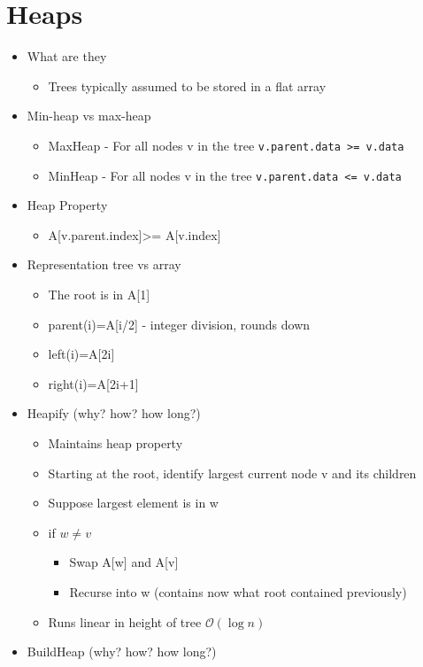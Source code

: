 \documentclass{article}[18pt]
\begin{document}
\section{Heaps}
\begin{itemize}
	\item What are they
	\begin{itemize}
		\item Trees typically assumed to be stored in a flat array
	\end{itemize}
	\item Min-heap vs max-heap
	\begin{itemize}
		\item MaxHeap - For all nodes v in the tree \texttt{v.parent.data >= v.data}
		\item MinHeap - For all nodes v in the tree \texttt{v.parent.data <= v.data}
	\end{itemize}
	\item Heap Property
	\begin{itemize}
		\item A[v.parent.index]>= A[v.index]
	\end{itemize}
	\item Representation tree vs array
	\begin{itemize}
		\item The root is in A[1]
		\item parent(i)=A[i/2] - integer division, rounds down
		\item left(i)=A[2i]
		\item right(i)=A[2i+1]
	\end{itemize}
	\item Heapify (why? how? how long?)
	\begin{itemize}
		\item Maintains heap property
		\item Starting at the root, identify largest current node v and its children
		\item Suppose largest element is in w
		\item if $w\neq v$
		\begin{itemize}
			\item Swap A[w] and A[v]
			\item Recurse into w (contains now what root contained previously)
		\end{itemize}
		\item Runs linear in height of tree $\mathcal{O}(\log n)$
	\end{itemize}
	\item BuildHeap (why? how? how long?)

\end{itemize}
\end{document}
